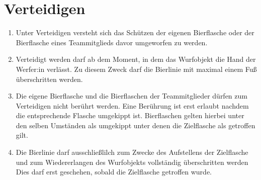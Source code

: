\section{Verteidigen}
\begin{enumerate}[label={(\arabic*)}]
    \item
    Unter Verteidigen versteht sich das Schützen der eigenen Bierflasche oder der Bierflasche eines Teammitglieds davor umgeworfen zu werden.

    \item
    Verteidigt werden darf ab dem Moment, in dem das Wurfobjekt die Hand der Werfer:in verlässt.
    Zu diesem Zweck darf die Bierlinie mit maximal einem Fuß überschritten werden.

    \item
    Die eigene Bierflasche und die Bierflaschen der Teammitglieder dürfen zum Verteidigen nicht berührt werden.
    Eine Berührung ist erst erlaubt nachdem die entsprechende Flasche umgekippt ist.
    Bierflaschen gelten hierbei unter den selben Umständen als umgekippt unter denen die Zielflasche als getroffen gilt.

    \item
    Die Bierlinie darf ausschließlilch zum Zwecke des Aufstellens der Zielflasche und zum Wiedererlangen des Wurfobjekts vollständig überschritten werden
    Dies darf erst geschehen, sobald die Zielflasche getroffen wurde.
\end{enumerate}

